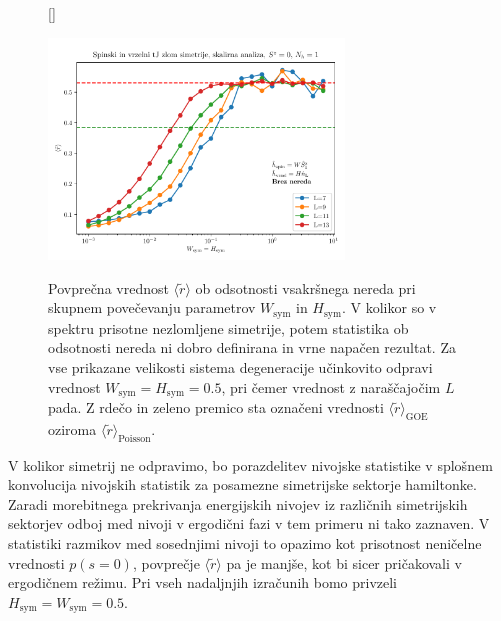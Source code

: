 \begin{figure}[H]
[\FBwidth]
{\caption{ Povprečna vrednost $\langle\tilde{r}\rangle$ ob odsotnosti vsakršnega nereda pri skupnem povečevanju parametrov $W_\mathrm{sym}$ in $H_\mathrm{sym}$. V kolikor so v spektru prisotne nezlomljene simetrije, potem statistika ob odsotnosti nereda ni dobro definirana in vrne napačen rezultat. Za vse prikazane velikosti sistema degeneracije učinkovito odpravi vrednost $W_\mathrm{sym}=H_\mathrm{sym}=0.5$, pri čemer vrednost z naraščajočim $L$ pada. Z rdečo in zeleno premico sta označeni vrednosti $\langle \tilde{r}\rangle_\mathrm{GOE}$ oziroma $\langle \tilde{r}\rangle_\mathrm{Poisson}$. }\label{fig:hole_spin_disorder_sym_break_13_1_6_slo}}
{\includegraphics[width=0.7\textwidth]{hole_spin_disorder_sym_break_13_1_6_slo.pdf}}
\end{figure}
\noindent
V kolikor simetrij ne odpravimo, bo porazdelitev nivojske statistike v splošnem konvolucija nivojskih statistik za posamezne simetrijske sektorje hamiltonke. Zaradi morebitnega prekrivanja energijskih nivojev iz različnih simetrijskih sektorjev odboj med nivoji v ergodični fazi v tem primeru ni tako zaznaven. V statistiki razmikov med sosednjimi nivoji to opazimo kot prisotnost neničelne vrednosti $p(s=0)$, povprečje $\langle \tilde{r}\rangle$ pa je manjše, kot bi sicer pričakovali v ergodičnem režimu. Pri vseh nadaljnjih izračunih bomo privzeli $H_\mathrm{sym}=W_\mathrm{sym}=0.5.$ 
